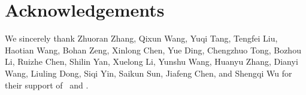 \section{Acknowledgements}
We sincerely thank Zhuoran Zhang, Qixun Wang, Yuqi Tang, Tengfei Liu, Haotian Wang, Bohan Zeng, Xinlong Chen, Yue Ding, Chengzhuo Tong, Bozhou Li, Ruizhe Chen, Shilin Yan, Xuelong Li, Yunshu Wang, Huanyu Zhang, Dianyi Wang, Liuling Dong, Siqi Yin, Saikun Sun, Jiafeng Chen, and Shengqi Wu for their support of \bench\ and \rmbench. 
